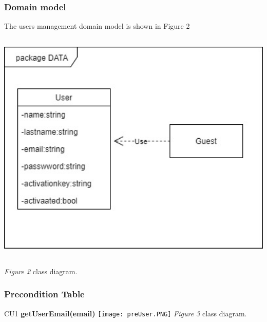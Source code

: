 \documentclass[runningheads,a4paper]{article}
\begin{document}
\subsubsection{\textbf{Domain model}}
The users management domain model is shown in Figure 2
\newline
\newline
\includegraphics[width=15cm , height=12cm]{../Images/userClass.jpg}
\newline 
\textit{Figure 2} class diagram.

\subsubsection{\textbf{Precondition Table}}
CU1 \textbf{getUserEmail(email)}
\newline
\newline
\texttt{[image: preUser.PNG]}
\newline 
\textit{Figure 3} class diagram.
\end{document}
